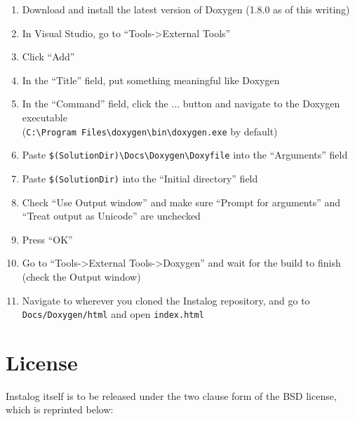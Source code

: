 \documentclass[letterpaper,12pt]{article}
\begin{document}
\begin{enumerate}
\item Download and install the latest version of Doxygen (1.8.0 as of this
writing)
\item In Visual Studio, go to ``Tools->External Tools''
\item Click ``Add''
\item In the ``Title'' field, put something meaningful like Doxygen
\item In the ``Command'' field, click the ... button and navigate to the Doxygen
executable  \\ (\verb|C:\Program Files\doxygen\bin\doxygen.exe| by default)
\item Paste \verb|$(SolutionDir)\Docs\Doxygen\Doxyfile| into the ``Arguments''
field 
\item Paste \verb|$(SolutionDir)| into the ``Initial directory'' field 
\item Check ``Use Output window'' and make sure ``Prompt for arguments'' and
``Treat output as Unicode'' are unchecked 
\item Press ``OK'' 
\item Go to ``Tools->External Tools->Doxygen'' and wait for the build to finish
(check the Output window) 
\item Navigate to wherever you cloned the Instalog repository, and go to
\verb|Docs/Doxygen/html| and open \verb|index.html|
\end{enumerate}

\newpage



{} 


\newpage



\appendix
\section{License} \label{license}
Instalog itself is to be released under the two clause form of the BSD license,
which is reprinted below:
\end{document}
